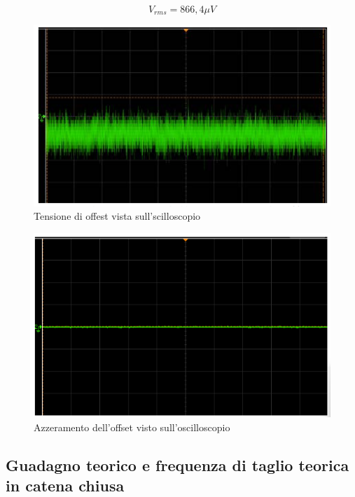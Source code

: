 \[V_{rms}=866,4 \mu V\]
\FloatBarrier
\begin{figure}
    \centering
    \includegraphics[width=0.5\linewidth]{media/tensioneOffest.png}
    \caption{Tensione di offest vista sull'scilloscopio}
    \label{fig:tensioneOffset}
\end{figure}
\begin{figure}
    \centering
    \includegraphics[width=0.5\linewidth]{media/azzeramentoOffset.png}
    \caption{Azzeramento dell'offset visto sull'oscilloscopio}
    \label{fig:azzeramentoOffset}
\end{figure}
\FloatBarrier

\subsection{Guadagno teorico e frequenza di taglio teorica in catena chiusa}

